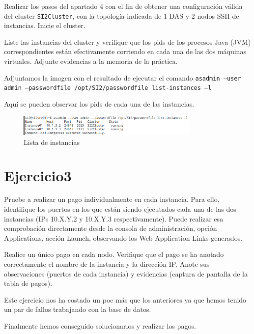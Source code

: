 \documentclass[a4paper, 10pt]{article}
\begin{document}
\begin{mdframed}
	 Realizar los pasos del apartado 4 con el fin de obtener una configuración válida del cluster
	 \texttt{SI2Cluster}, con la topología indicada de 1 DAS y 2 nodos SSH de instancias. Inicie el cluster. 
	 
	 Liste las instancias del cluster y verifique que los pids de los procesos Java (JVM) correspondientes están
	 efectivamente corriendo en cada una de las dos máquinas virtuales. Adjunte evidencias a la memoria de la
	 práctica. 
\end{mdframed}	

	Adjuntamos la imagen con  el resultado de ejecutar el comando \texttt{asadmin --user admin --passwordfile /opt/SI2/passwordfile list-instances –l}
 
 	Aquí se pueden observar los pids de cada una de las instancias.
 	\begin{figure}[hbtp]
 		\centering
 		\includegraphics[width=0.8\textwidth]{../../P3/pantallazos/ej2_listar_instancias.png}
 		\caption {Lista de instancias}
 	\end{figure}
 \newpage
 \section{Ejercicio3}
 
 \begin{mdframed}
 	 Pruebe a realizar un pago individualmente en cada instancia. Para ello, identifique los
 	 puertos en los que están siendo ejecutados cada una de las dos instancias (IPs 10.X.Y.2 y 10.X.Y.3
 	 respectivamente). Puede realizar esa comprobación directamente desde la consola de administración,
 	 opción Applications, acción Launch, observando los Web Application Links generados.
 	 
 	 Realice un único pago en cada nodo. Verifique que el pago se ha anotado correctamente el nombre de la
 	 instancia y la dirección IP. Anote sus observaciones (puertos de cada instancia) y evidencias (captura de
 	 pantalla de la tabla de pagos). 
 \end{mdframed}
 
Este ejercicio nos ha costado un poc más que los anteriores ya que hemos tenido un par de fallos trabajando con la base de datos.

Finalmente hemos conseguido solucionarlos y realizar los pagos.
\end{document}
